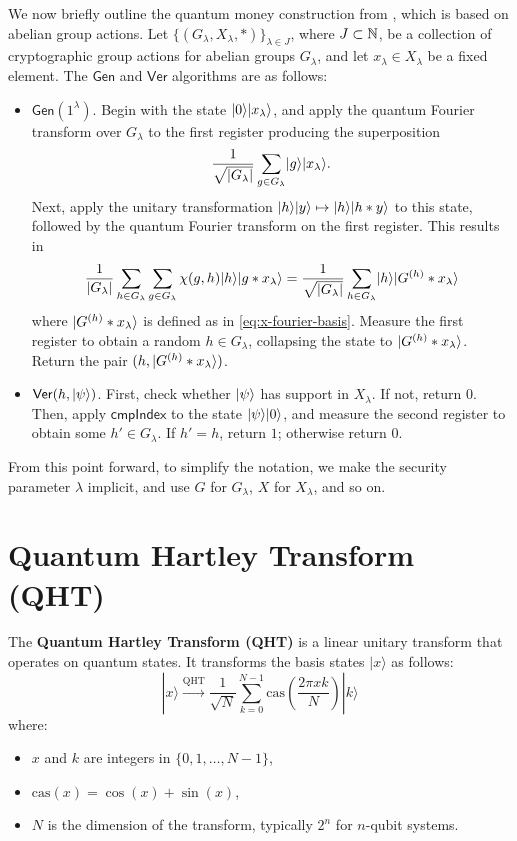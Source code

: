 \documentclass[11pt]{article}
\theoremstyle{definition}
\newcommand{\comph}{\mathsf{cmpIndex}}
\newcommand{\gen}{\mathsf{Gen}}
\newcommand{\ver}{\mathsf{Ver}}
\begin{document}
We now briefly outline the quantum money construction from \cite{zhandry2024quantum}, which is based on abelian group actions. Let $\{(G_\lambda, X_\lambda, *)\}_{\lambda \in J}$, where $J \subset \mathbb{N}$, be a collection of cryptographic group actions for abelian groups $G_\lambda$, and let $x_\lambda \in X_\lambda$ be a fixed element. The $\gen$ and $\ver$ algorithms are as follows:
\begin{itemize}
\item $\gen(1^\lambda)$. Begin with the state $\lvert0\rangle\lvert x_\lambda\rangle$, and apply the quantum Fourier transform over $G_\lambda$ to the first register producing the superposition
    \[ \frac{1}{\sqrt{\lvert G_\lambda\rvert}} \sum_{g \in G_\lambda} \lvert g\rangle\lvert x_\lambda\rangle. \]
    Next, apply the unitary transformation $\lvert h\rangle\lvert y\rangle \mapsto \lvert h\rangle\lvert h * y\rangle$ to this state, followed by the quantum Fourier transform on the first register. This results in
    \[ \frac{1}{\lvert G_\lambda\rvert} \sum_{h \in G_\lambda} \sum_{g \in G_\lambda} \chi(g, h) \lvert h\rangle\lvert g * x_\lambda\rangle = \frac{1}{\sqrt{\lvert G_\lambda\rvert}} \sum_{h \in G_\lambda} \lvert h\rangle \lvert G^{(h)} * x_\lambda\rangle \]
    where $\lvert G^{(h)} * x_\lambda\rangle$ is defined as in \eqref{eq:x-fourier-basis}. Measure the first register to obtain a random $h \in G_\lambda$, collapsing the state to $\lvert G^{(h)} * x_\lambda\rangle$. Return the pair $(h, \lvert G^{(h)} * x_\lambda\rangle)$.

\item $\ver(h, \ket{\psi})$. First, check whether $\lvert\psi\rangle$ has support in $X_\lambda$. If not, return $0$. Then, apply $\comph$ to the state $\lvert\psi\rangle\lvert0\rangle$, and measure the second register to obtain some $h' \in G_\lambda$. If $h' = h$, return $1$; otherwise return $0$.
\end{itemize}

From this point forward, to simplify the notation, we make the security parameter $\lambda$ implicit, and use $G$ for $G_\lambda$, $X$ for $X_\lambda$, and so on. 





\section*{Quantum Hartley Transform (QHT)}

The \textbf{Quantum Hartley Transform (QHT)} is a linear unitary transform that operates on quantum states. It transforms the basis states \( |x\rangle \) as follows:
\[
|x\rangle \xrightarrow{\text{QHT}} \frac{1}{\sqrt{N}} \sum_{k=0}^{N-1} \text{cas}\left(\frac{2\pi x k}{N}\right) |k\rangle
\]
where:
\begin{itemize}
    \item \( x \) and \( k \) are integers in \( \{0, 1, \dots, N-1\} \),
    \item \( \text{cas}(x) = \cos(x) + \sin(x) \),
    \item \( N \) is the dimension of the transform, typically \( 2^n \) for \( n \)-qubit systems.
\end{itemize}
\end{document}
